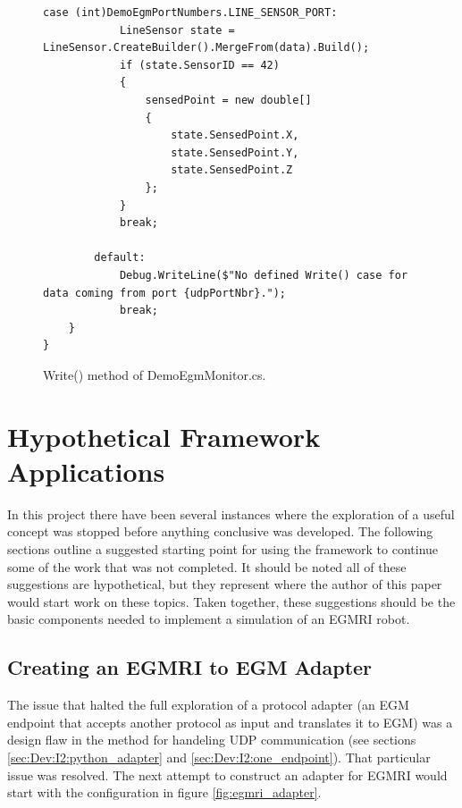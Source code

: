 \documentclass{cslthse-msc}
\begin{document}
\begin{appendices}
\begin{figure}[H]
\begin{lstlisting}[fontadjust]
        case (int)DemoEgmPortNumbers.LINE_SENSOR_PORT:
            LineSensor state = LineSensor.CreateBuilder().MergeFrom(data).Build();
            if (state.SensorID == 42)
            {
                sensedPoint = new double[]
                {
                    state.SensedPoint.X,
                    state.SensedPoint.Y,
                    state.SensedPoint.Z
                };
            }
            break;

        default:
            Debug.WriteLine($"No defined Write() case for data coming from port {udpPortNbr}.");
            break;
    }
}
\end{lstlisting}
\caption{Write() method of DemoEgmMonitor.cs.}
\label{fig:DemoEgmMonitor_Write}
\end{figure}





\chapter{Hypothetical Framework Applications}
\label{app:Hypothetical}
In this project there have been several instances where the exploration of a useful concept was stopped before anything conclusive was developed. The following sections outline a suggested starting point for using the framework to continue some of the work that was not completed. It should be noted all of these suggestions are hypothetical, but they represent where the author of this paper would start work on these topics. Taken together, these suggestions should be the basic components needed to implement a simulation of an EGMRI robot.
 
\newpage
\section{Creating an EGMRI to EGM Adapter}
\label{app:Hypothetical:egmri_adapter}
The issue that halted the full exploration of a protocol adapter (an EGM endpoint that accepts another protocol as input and translates it to EGM) was a design flaw in the method for handeling UDP communication (see sections \ref{sec:Dev:I2:python_adapter} and \ref{sec:Dev:I2:one_endpoint}). That particular issue was resolved. The next attempt to construct an adapter for EGMRI would start with the configuration in figure \ref{fig:egmri_adapter}.


\end{appendices}
\end{document}
